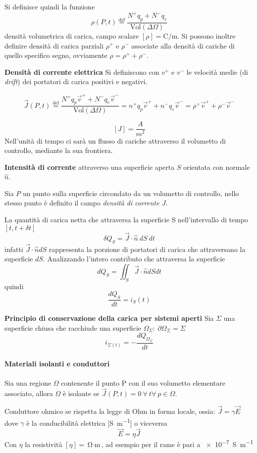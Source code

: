 Si definisce quindi la funzione 
$$
\rho(P,t) \stackrel{\text{def}}{=} \frac{N^+q_p+N^-q_e}{\text{Vol}(\Delta\Omega)}
$$
densità volumetrica di carica, campo scalare $[\rho] = \si{\coulomb\per\meter}$.
Si possono inoltre definire densità di carica parziali $\rho^+$ e $\rho^-$ associate alla densità
di cariche di quello specifico segno, ovviamente $\rho = \rho^+ + \rho^-$.

\textbf{Densità di corrente elettrica}
Si definiscono con $v^+$ e $v^-$ le velocità medie (di \textit{drift}) dei portatori di carica positivi e negativi.


$$
\vec{J}(P,t) \stackrel{\text{def}}{=} \frac{N^+q_p\vec{v}^+ + N^-q_e\vec{v}^-}{\text{Vol}(\Delta \Omega)} = 
n^+q_p\vec{v}^+ + n^-q_e\vec{v}^- = \rho^+ \vec{v}^+ + \rho^- \vec{v}^-
$$

$$
[J] = \frac{A}{m^2}
$$
Nell'unità di tempo ci sarà un flusso di cariche attraverso il volumetto di controllo, mediante la sua 
frontiera.

\textbf{Intensità di corrente} attraverso una superficie aperta $S$ orientata con normale $\hat{n}$.

Sia $P$ un punto sulla superficie circondato da un volumetto di controllo, nello stesso punto
è definito il campo \textit{densità di corrente $J$}.

La quantità di carica netta che attraversa la superficie S nell'intervallo di tempo $[t,t+\delta t]$
$$
\delta Q_S = \vec{J}\cdot \hat{n}\ dS\ dt
$$
infatti $\vec{J}\cdot\hat{n}dS$ rappresenta la porzione di portatori di carica che attraversano
la superficie $dS$. Analizzando l'intero contributo che attraversa la superficie
$$
dQ_S = \iint_S \vec{J}\cdot\hat{n}dS dt
$$
quindi
$$
\frac{dQ_S}{dt} = i_S(t)
$$

\textbf{Principio di conservazione della carica per sistemi aperti}
Sia $\Sigma$ una superficie chiusa che racchiude una superficie
$\Omega_\Sigma:\ \partial\Omega_\Sigma=\Sigma$
$$
i_{\Sigma(t)} = - \frac{dQ_{\Omega_\Sigma}}{dt}
$$

\paragraph{Materiali isolanti e conduttori}
Sia una regione $\Omega$ contenente il punto P con il suo volumetto elementare associato, allora
$\Omega$ è isolante se $\vec{J}(P,t) = 0\ \forall\ t \forall\ p \in \Omega$.

Conduttore ohmico se rispetta la legge di Ohm in forma locale, ossia:
$\vec{J} = \gamma\vec{E}$ dove $\gamma$ è la conducibilità elettrica [\si{\siemens\per\meter}]
o viceversa
$$
\vec{E} = \eta \vec{J}
$$
Con $\eta$ la resistività $[\eta] = \si{\ohm\cdot\meter}$, ad esempio per il rame è pari a 
\SI{e-7}{\siemens\per\meter}
